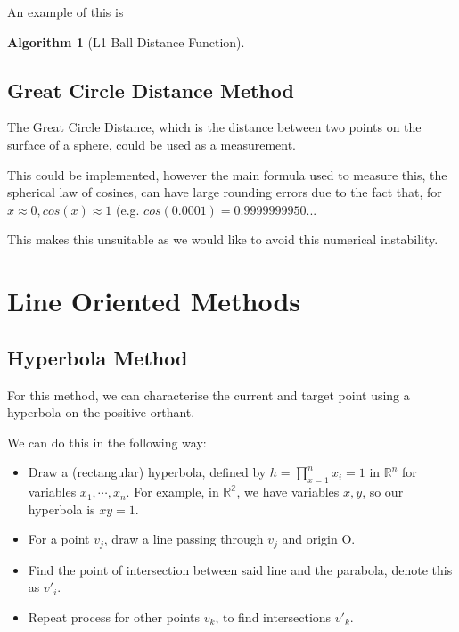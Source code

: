 \documentclass[12pt,a4paper]{report}
\newtheorem{algorithm}[theorem]{Algorithm}
\begin{document}
An example of this is 

\begin{algorithm}[L1 Ball Distance Function]\
 \begin{algorithmic}[1]
 \STATE{dist(l) = $\sqrt{\sum_{i=1}^{n} (a_{i} - b_{i})^{2}}$.}
 \end{algorithmic}
 \end{algorithm}

\subsection{Great Circle Distance Method}
 The Great Circle Distance, which is the distance between two points on the surface of a sphere, could be used as a measurement.
 
 This could be implemented, however the main formula used to measure this, the spherical law of cosines, can have large rounding errors due to the fact that, for $x \approx 0, cos(x) \approx 1$ (e.g. $cos(0.0001) = 0.9999999950...$

This makes this unsuitable as we would like to avoid this numerical instability.

\section{Line Oriented Methods}
\subsection{Hyperbola Method}
For this method, we can characterise the current and target point using a hyperbola on the positive orthant.

We can do this in the following way:

\begin{itemize}
    \item Draw a (rectangular) hyperbola, defined by $h = \prod_{x=1}^{n} x_{i} = 1$ in $\mathbb R^{n}$ for variables $x_{1}, \cdots, x_{n}$. For example, in $\mathbb{R^2}$, we have variables $x,y$, so our hyperbola is $xy = 1$.
    \item For a point $v_{j}$, draw a line passing through $v_{j}$ and origin O.
    \item Find the point of intersection between said line and the parabola, denote this as $v'_{i}$.
    \item Repeat process for other points $v_{k}$, to find intersections $v'_{k}$.
\end{itemize}
\end{document}
